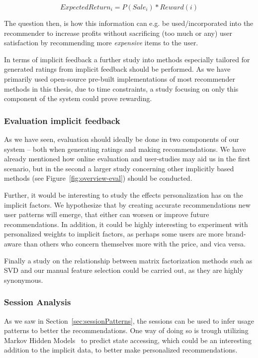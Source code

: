 \begin{equation}
ExpectedReturn_i = P(Sale_i) * Reward(i)
\end{equation}

The question then, is how this information can e.g. be used/incorporated into
the recommender to increase profits without sacrificing (too much or any) user
satisfaction by recommending more \emph{expensive} items to the user.

In terms of implicit feedback a further study into methods especially tailored
for generated ratings from implicit feedback should be performed. As we have
primarily used open-source pre-built implementations of most recommender
methods in this thesis, due to time constraints, a study focusing on only this
component of the system could prove rewarding.

\subsubsection{Evaluation implicit feedback}

As we have seen, evaluation should ideally be done in two components of our
system -- both when generating ratings and making recommendations. We have
already mentioned how online evaluation and user-studies may aid us in the
first scenario, but in the second a larger study concerning other implicitly
based methods (see Figure~\ref{fig:overview-eval}) should be conducted.

Further, it would be interesting to study the effects personalization has on
the implicit factors. We hypothesize that by creating accurate recommendations
new user patterns will emerge, that either can worsen or improve future
recommendations. In addition, it could be highly interesting to experiment with
personalized weights to implicit factors, as perhaps some users are more
brand-aware than others who concern themselves more with the price, and vica
versa.

Finally a study on the relationship between matrix factorization methods such
as SVD and our manual feature selection could be carried out, as they are
highly synonymous.

\subsubsection{Session Analysis}

As we saw in Section~\ref{sec:sessionPatterns}, the sessions can be used to infer usage patterns to better the recommendations. One way of doing so is trough utilizing Markov Hidden Models~\cite{rabiner1986introduction} to predict state accessing, which could be an interesting addition to the implicit data, to better make personalized recommendations.


